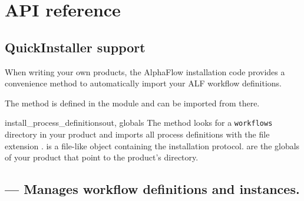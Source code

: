 \chapter{API reference}

  \section{QuickInstaller support}
    
    When writing your own products, the AlphaFlow installation code provides
    a convenience method to automatically import your ALF workflow definitions.

    The method is defined in the module 
    and can be imported from there.

    \begin{funcdesc}{install_process_definitions}{out, globals}
      The method looks for a \verb|workflows| directory in your product 
      and imports all process definitions with the file extension .
       is a file-like object containing the installation protocol. 
      are the globals of your product that point to the product's directory.
    \end{funcdesc}

  \section{ --- Manages workflow definitions and instances.}

 
